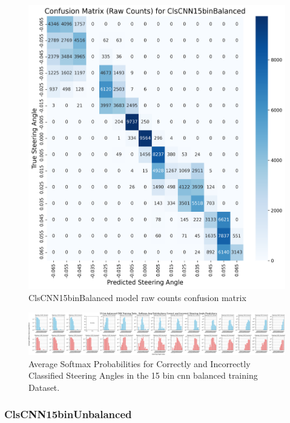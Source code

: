 \begin{figure}[H]
\centering
\includegraphics[width=1\linewidth]{Figures/Results/cm_raw_ClsCNN15binBalanced.png}
\caption{ClsCNN15binBalanced model raw counts confusion matrix}
\label{fig:cm_raw_ClsCNN15binBalanced}
\end{figure}

\begin{figure}[H]
    \centering
    \includegraphics[width=1\linewidth]{Figures/Results/15_bins_cnn_softmax_dist_plot_balanced.png}
    \caption{Average Softmax Probabilities for Correctly and Incorrectly Classified Steering Angles in the 15 bin cnn balanced training Dataset.}
    \label{fig:15_bins_cnn_softmax_dist_balanced}
\end{figure}


\subsubsection{ClsCNN15binUnbalanced}


